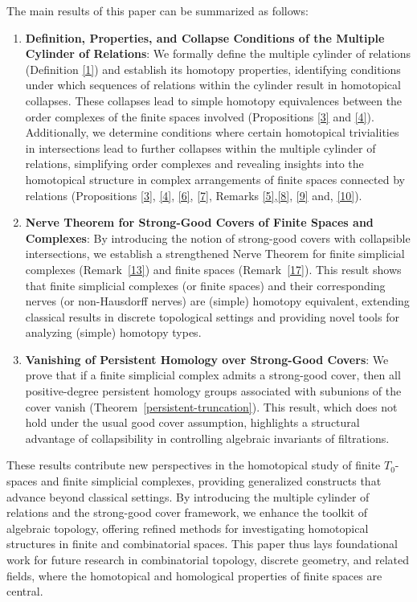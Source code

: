 \documentclass[12pt,a4paper,twoside, reqno, tbtags]{article}
\numberwithin{equation}{section}
\begin{document}
\noindent The main results of this paper can be summarized as follows:
\begin{enumerate}
    \item \textbf{Definition, Properties, and Collapse Conditions of the Multiple Cylinder of Relations}: We formally define the multiple cylinder of relations (Definition \ref{1}) and establish its homotopy properties, identifying conditions under which sequences of relations within the cylinder result in homotopical collapses. These collapses lead to simple homotopy equivalences between the order complexes of the finite spaces involved (Propositions \ref{3} and \ref{4}). Additionally, we determine conditions where certain homotopical trivialities in intersections lead to further collapses within the multiple cylinder of relations, simplifying order complexes and revealing insights into the homotopical structure in complex arrangements of finite spaces connected by relations (Propositions \ref{3}, \ref{4}, \ref{6}, \ref{7}, Remarks \ref{5},\ref{8}, \ref{9} and, \ref{10}).

    \item \textbf{Nerve Theorem for Strong-Good Covers of Finite Spaces and Complexes}: By introducing the notion of strong-good covers with collapsible intersections, we establish a strengthened Nerve Theorem for finite simplicial complexes (Remark~\ref{13}) and finite spaces (Remark~\ref{17}). This result shows that finite simplicial complexes (or finite spaces) and their corresponding nerves (or non-Hausdorff nerves) are (simple) homotopy equivalent, extending classical results in discrete topological settings and providing novel tools for analyzing (simple) homotopy types.

    \item \textbf{Vanishing of Persistent Homology over Strong-Good Covers}: We prove that if  a  finite simplicial complex admits a strong-good cover, then all positive-degree persistent homology groups associated with subunions of the cover vanish (Theorem~\ref{persistent-truncation}). This result, which does not hold under the usual good cover assumption, highlights a structural advantage of collapsibility in controlling algebraic invariants of filtrations.
\end{enumerate}

These results contribute new perspectives in the homotopical study of finite \( T_0 \)-spaces and finite simplicial complexes, providing generalized constructs that advance beyond classical settings. By introducing the multiple cylinder of relations and the strong-good cover framework, we enhance the toolkit of algebraic topology, offering refined methods for investigating homotopical structures in finite and combinatorial spaces. This paper thus lays foundational work for future research in combinatorial topology, discrete geometry, and related fields, where the homotopical and homological properties of finite spaces are central.
\end{document}
